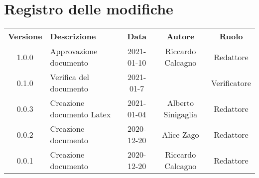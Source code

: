 \section*{Registro delle modifiche}

\begin{center}
	\begin{longtable}{|c|p{5cm}|c|c|c|}
	\hline
	\rowcolor{lighter-grayer}
	\textbf{Versione} & \textbf{Descrizione} & \textbf{Data} & \textbf{Autore} & \textbf{Ruolo} \\
	\hline
	\endfirsthead


	1.0.0 & Approvazione documento & 2021-01-10 & Riccardo Calcagno & Redattore \\
	\hline
	0.1.0 & Verifica del documento & 2021-01-7 &  & Verificatore \\
	\hline
	0.0.3 & Creazione documento Latex & 2021-01-04 & Alberto Sinigaglia & Redattore \\
	\hline
	0.0.2 & Creazione documento & 2020-12-20 & Alice Zago & Redattore \\
	\hline
	0.0.1 & Creazione documento & 2020-12-20 & Riccardo Calcagno & Redattore \\
	\hline

	\end{longtable}
\end{center}